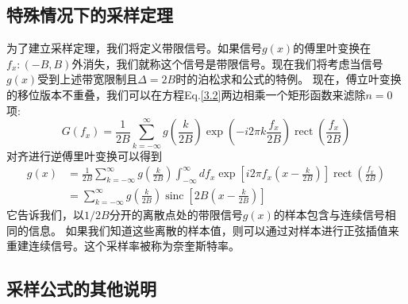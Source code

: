 \documentclass[10pt, UTF8]{ctexart}%
\def\CodingInline#1{\colorbox{shadecolor}{\color{black}#1}}%
\newcommand{\InsertEqution}[2]{\begin{equation}
  \label{#1}
   #2
 \end{equation}}
\newcommand{\RefEq}[1]{Eq.\ref{#1}}
\newcommand{\InsertInlineEq}[1]{$#1$}
\begin{document}
\begin{sloppypar}
\subsection{特殊情况下的采样定理}
为了建立采样定理，我们将定义带限信号。如果信号\InsertInlineEq{g(x)}的傅里叶变换在\InsertInlineEq{f_{x}:(-B, B)}外消失，我们就称这个信号是带限信号。现在我们将考虑当信号\InsertInlineEq{g(x)}受到上述带宽限制且\InsertInlineEq{\Delta = 2B}时的泊松求和公式的特例。 现在，傅立叶变换的移位版本不重叠，我们可以在方程\RefEq{3.2}两边相乘一个矩形函数来滤除\InsertInlineEq{n=0}项:\InsertEqution{3.5}{G\left(f_{x}\right)=\frac{1}{2 B} \sum_{k=-\infty}^{\infty} g\left(\frac{k}{2 B}\right) \exp \left(-i 2 \pi k \frac{f_{x}}{2 B}\right) \operatorname{rect}\left(\frac{f_{x}}{2 B}\right)}
对齐进行逆傅里叶变换可以得到\InsertEqution{3.6}{\begin{aligned}
  g(x) &=\frac{1}{2 B} \sum_{k=-\infty}^{\infty} g\left(\frac{k}{2 B}\right) \int_{-\infty}^{\infty} d f_{x} \exp \left[i 2 \pi f_{x}\left(x-\frac{k}{2 B}\right)\right] \operatorname{rect}\left(\frac{f_{x}}{2 B}\right) \\
  &=\sum_{k=-\infty}^{\infty} g\left(\frac{k}{2 B}\right) \operatorname{sinc}\left[2 B\left(x-\frac{k}{2 B}\right)\right]
\end{aligned}}
它告诉我们，以\InsertInlineEq{1/2B}分开的离散点处的带限信号\InsertInlineEq{g(x)}的样本包含与连续信号相同的信息。 如果我们知道这些离散的样本值，则可以\CodingInline{通过对样本进行正弦插值}来重建连续信号。这个采样率被称为奈奎斯特率。
\subsection{采样公式的其他说明}

  \end{sloppypar}
\end{document}
